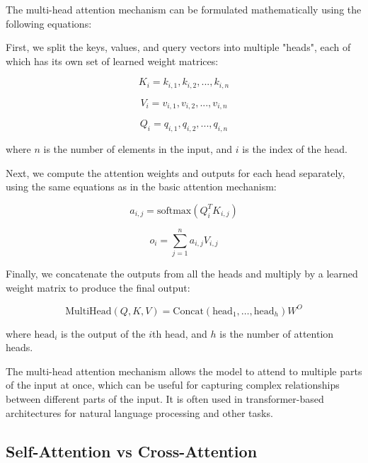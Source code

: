 The multi-head attention mechanism can be formulated mathematically using the following equations:

First, we split the keys, values, and query vectors into multiple "heads", each of which has its own set of learned weight matrices:

\begin{equation}
	K_i = {k_{i,1}, k_{i,2}, ..., k_{i,n}}
\end{equation}

\begin{equation}
	V_i = {v_{i,1}, v_{i,2}, ..., v_{i,n}}
\end{equation}

\begin{equation}
	Q_i = {q_{i,1}, q_{i,2}, ..., q_{i,n}}
\end{equation}

where $n$ is the number of elements in the input, and $i$ is the index of the head.

Next, we compute the attention weights and outputs for each head separately, using the same equations as in the basic attention mechanism:

\begin{equation}
	a_{i,j} = \text{softmax}(Q_i^T K_{i,j})
\end{equation}

\begin{equation}
	o_{i} = \sum_{j=1}^{n} a_{i,j} V_{i,j}
\end{equation}

Finally, we concatenate the outputs from all the heads and multiply by a learned weight matrix to produce the final output:

\begin{equation}
	\text{MultiHead}(Q, K, V) = \text{Concat}(\text{head}_1, \dots, \text{head}_h)W^O
\end{equation}

where $\text{head}_i$ is the output of the $i$th head, and $h$ is the number of attention heads.

The multi-head attention mechanism allows the model to attend to multiple parts of the input at once, which can be useful for capturing complex relationships between different parts of the input. It is often used in transformer-based architectures for natural language processing and other tasks.

\subsection{Self-Attention vs Cross-Attention}
\label{subsec:3_self_attention_vs_cross_attention}

